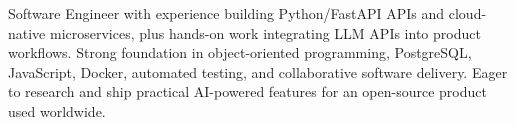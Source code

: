 \par{
Software Engineer with experience building Python/FastAPI APIs and cloud-native microservices, plus hands-on work integrating LLM APIs into product workflows. Strong foundation in object-oriented programming, PostgreSQL, JavaScript, Docker, automated testing, and collaborative software delivery. Eager to research and ship practical AI-powered features for an open-source product used worldwide.
}
